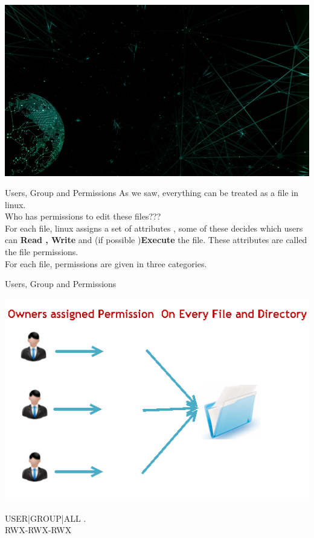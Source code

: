 \documentclass{beamer}
\begin{document}
{
	\usebackgroundtemplate%
	{%
	    \includegraphics[width=\paperwidth,height=\paperheight]{./back_net.jpg}%
	}
\selectfont
\begin{frame}{Users, Group and Permissions}
	As we saw, everything can be treated as a file in linux. \\
	\pause
	Who has permissions to edit these files???\\
	\pause
	For each file, linux assigns a set of attributes , some of these decides which users can {\textbf{Read , Write}} and (if possible )\textbf{Execute} the file. These attributes are called the file permissions. \\
	\pause
	For each file, permissions are given in three categories.
			
\end{frame}
\begin{frame}{Users, Group and Permissions}
\begin{center}
		\includegraphics[scale=0.45]{./file_permissions_white.png}%

			USER|GROUP|ALL . \\
			 RWX-RWX-RWX\\
\end{center}

			
\end{frame}
}
\end{document}
